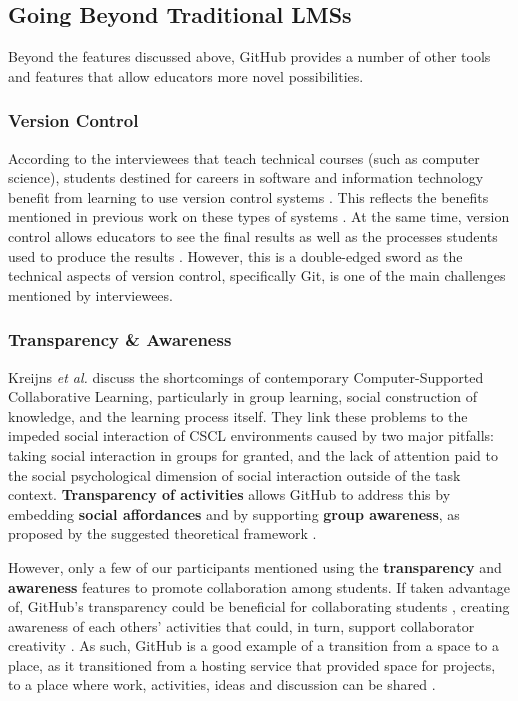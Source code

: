 \subsection{Going Beyond Traditional LMSs}
Beyond the features discussed above, GitHub provides a number of other tools and features that allow educators more novel possibilities.

\subsubsection{Version Control}
According to the interviewees that teach technical courses (such as computer science), students destined for careers in software and information technology benefit from learning to use version control systems \cite{britton2013using}. This reflects the benefits mentioned in previous work on these types of systems \cite{reid2005learning}. At the same time, version control allows educators to see the final results as well as the processes students used to produce the results \cite{glassy2006using}. However, this is a double-edged sword as the technical aspects of version control, specifically Git, is one of the main challenges mentioned by interviewees.


\subsubsection{Transparency \& Awareness}
Kreijns \textit{et al.} \cite{kreijns2013social} discuss the shortcomings of contemporary Computer-Supported Collaborative Learning, particularly in group learning, social construction of knowledge, and the learning process itself. They link these problems to the impeded social interaction of CSCL environments caused by two major pitfalls: taking social interaction in groups for granted, and the lack of attention paid to the social psychological dimension of social interaction outside of the task context. \textbf{Transparency of activities} allows GitHub to address this by embedding \textbf{social affordances} and by supporting \textbf{group awareness}, as proposed by the suggested theoretical framework \cite{kreijns2002sociability}.

However, only a few of our participants mentioned using the \textbf{transparency} and \textbf{awareness} features to promote collaboration among students. If taken advantage of, GitHub's transparency could be beneficial for collaborating students \cite{dalsgaard2009transparency}, creating awareness of each others' activities that could, in turn, support collaborator creativity \cite{farooq2007supporting}. As such, GitHub is a good example of a transition from a space to a place, as it transitioned from a hosting service that provided space for projects, to a place where work, activities, ideas and discussion can be shared \cite{dourish1992awareness}.
\\ %
